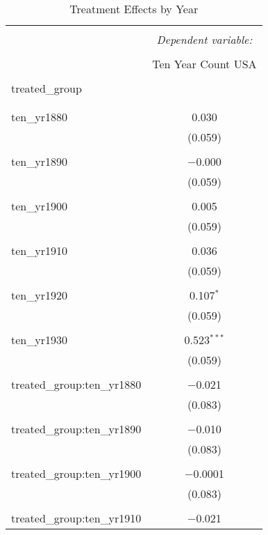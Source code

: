 
\begin{table}[!htbp] \centering 
  \caption{Treatment Effects by Year} 
  \label{table5.1} 
\begin{tabular}{@{\extracolsep{5pt}}lc} 
\\[-1.8ex]\hline 
\hline \\[-1.8ex] 
 & \multicolumn{1}{c}{\textit{Dependent variable:}} \\ 
\cline{2-2} 
\\[-1.8ex] & Ten Year Count USA \\ 
\hline \\[-1.8ex] 
 treated\_group &  \\ 
  &  \\ 
  & \\ 
 ten\_yr1880 & 0.030 \\ 
  & (0.059) \\ 
  & \\ 
 ten\_yr1890 & $-$0.000 \\ 
  & (0.059) \\ 
  & \\ 
 ten\_yr1900 & 0.005 \\ 
  & (0.059) \\ 
  & \\ 
 ten\_yr1910 & 0.036 \\ 
  & (0.059) \\ 
  & \\ 
 ten\_yr1920 & 0.107$^{*}$ \\ 
  & (0.059) \\ 
  & \\ 
 ten\_yr1930 & 0.523$^{***}$ \\ 
  & (0.059) \\ 
  & \\ 
 treated\_group:ten\_yr1880 & $-$0.021 \\ 
  & (0.083) \\ 
  & \\ 
 treated\_group:ten\_yr1890 & $-$0.010 \\ 
  & (0.083) \\ 
  & \\ 
 treated\_group:ten\_yr1900 & $-$0.0001 \\ 
  & (0.083) \\ 
  & \\ 
 treated\_group:ten\_yr1910 & $-$0.021 \\ 

\end{tabular}
\end{table}

